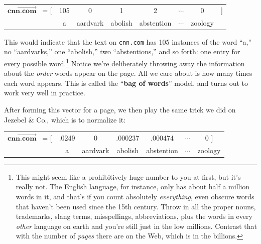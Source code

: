 \begin{alttitles}
\vspace{-.15in}
\begin{center}
\begin{tabular}{cccccccc}
$\overrightarrow{\textbf{cnn.com}}$ \ = [ & 105 & 0 & 1 & 2 & $\cdots$ & 0 & ] \\
& \scriptsize{a} & \scriptsize{aardvark} & \scriptsize{abolish} &
\scriptsize{abstention} & $\cdots$ & \scriptsize{zoology} & \medskip \\
\end{tabular}
\end{center}
\vspace{-.15in}


This would indicate that the text on \texttt{cnn.com} has 105 instances of the
word ``a,'' no ``aardvarks,'' one ``abolish,'' two ``abstentions,'' and so
forth: one entry for every possible word.\footnote{This might seem like a
prohibitively huge number to you at first, but it's really not. The English
language, for instance, only has about half a million words in it, and that's
if you count absolutely \textit{everything}, even obscure words that haven't
been used since the 15th century. Throw in all the proper nouns, trademarks,
slang terms, misspellings, abbreviations, plus the words in every
\textit{other} language on earth and you're still just in the low millions.
Contrast that with the number of \textit{pages} there are on the Web, which is
in the billions.} Notice we're deliberately throwing away the information about
the \textit{order} words appear on the page. All we care about is how many
times each word appears. This is called the ``\textbf{bag of words}'' model,
and turns out to work very well in practice.

After forming this vector for a page, we then play the same trick we did on
Jezebel \& Co., which is to normalize it:

\vspace{-.15in}
\begin{center}
\begin{tabular}{ccccccc}
$\overrightarrow{\textbf{cnn.com}}$ \ = [ & \footnotesize{.0249} &
\footnotesize{0} & \footnotesize{.000237} & \footnotesize{.000474} & $\cdots$ &
\footnotesize{0} \quad ] \\
& \scriptsize{a} & \scriptsize{aardvark} & \scriptsize{abolish} &
\scriptsize{abstention} & $\cdots$ & \scriptsize{zoology} \quad \medskip \\
\end{tabular}
\end{center}
\vspace{-.15in}


\end{alttitles}
